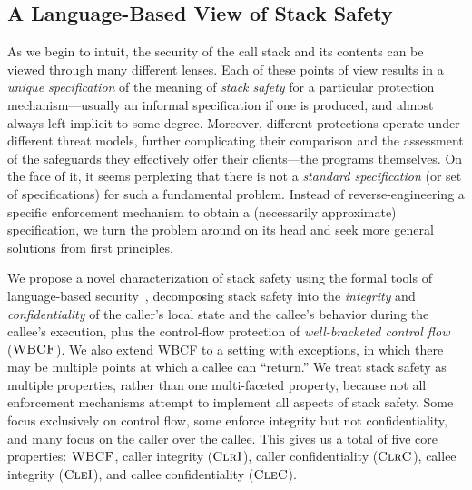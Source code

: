 \subsection{A Language-Based View of Stack Safety}

As we begin to intuit, the security of the call stack and its contents can be
viewed through many different lenses. Each of these points of view results in a
\emph{unique specification} of the meaning of \emph{stack safety} for a
particular protection mechanism---usually an informal specification if one is
produced, and almost always left implicit to some degree.
%
Moreover, different protections operate under different threat models, further
complicating their comparison and the assessment of the safeguards they
effectively offer their clients---the programs themselves.
%
On the face of it, it seems perplexing that there is not a \emph{standard
specification} (or set of specifications) for such a fundamental problem.
Instead of reverse-engineering a specific enforcement mechanism to obtain a
(necessarily approximate) specification, we turn the problem around on its head
and seek more general solutions from first principles.
%

We propose a novel characterization of stack safety using the formal tools of language-based
security~\cite{sabelfeld2003language}, decomposing stack safety into
the {\em integrity} and {\em confidentiality} of the caller’s local state
and the callee's behavior during the callee's execution, plus the control-flow protection
of {\em well-bracketed control flow}~\cite{SkorstengaardSTKJFP} (\(\textnormal{\sc WBCF}\)).
\ifexceptions
We also extend WBCF to a setting with exceptions,
in which there may be multiple points at which a callee can ``return.''
\fi
%
We treat stack safety as multiple properties, rather than one multi-faceted property, because
not all enforcement mechanisms attempt to implement all aspects of stack safety. Some focus
exclusively on control flow, some enforce integrity but not confidentiality, and many
focus on the caller over the callee.
%
%
This gives us a total of five core properties: \(\textnormal{\sc WBCF}\),
caller integrity (\(\textnormal{\sc ClrI}\)), caller confidentiality (\(\textnormal{\sc ClrC}\)),
callee integrity (\(\textnormal{\sc CleI}\)), and callee confidentiality (\(\textnormal{\sc CleC}\)).
%

